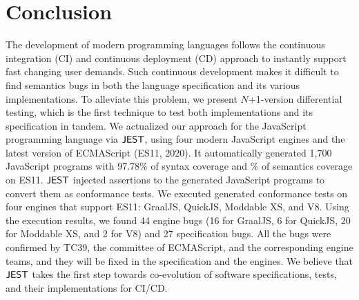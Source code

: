 \section{Conclusion}\label{sec:conclude}
The development of modern programming languages follows the continuous integration (CI) and
continuous deployment (CD) approach to instantly support fast changing user demands.
Such continuous development makes it difficult to find semantics bugs
in both the language specification and its various implementations.
To alleviate this problem, we present $N$+1-version differential testing,
which is the first technique to test both implementations and its specification in tandem.
We actualized our approach for the JavaScript programming language via $\tool$,
using four modern JavaScript engines and the latest version of ECMAScript (ES11, 2020).
It automatically generated 1,700 JavaScript programs with 97.78\% of syntax
coverage and \% of semantics coverage on ES11.  $\tool$ injected assertions
to the generated JavaScript programs to convert them as conformance tests.
We executed generated conformance tests on four engines that support ES11:
GraalJS, QuickJS, Moddable XS, and V8.  Using the execution results,
we found 44 engine bugs (16 for GraalJS, 6 for QuickJS,
20 for Moddable XS, and 2 for V8) and 27 specification bugs.
All the bugs were confirmed by TC39, the committee of ECMAScript, and
the corresponding engine teams, and they will be fixed in the specification and the engines.
We believe that $\tool$ takes the first step towards co-evolution of
software specifications, tests, and their implementations for CI/CD.
